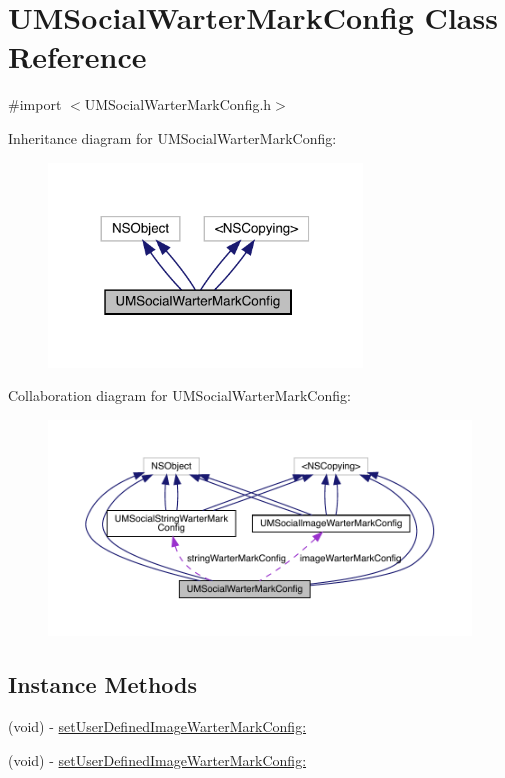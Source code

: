 \hypertarget{interface_u_m_social_warter_mark_config}{}\section{U\+M\+Social\+Warter\+Mark\+Config Class Reference}
\label{interface_u_m_social_warter_mark_config}


{\ttfamily \#import $<$U\+M\+Social\+Warter\+Mark\+Config.\+h$>$}



Inheritance diagram for U\+M\+Social\+Warter\+Mark\+Config\+:\nopagebreak
\begin{figure}[H]
\begin{center}
\leavevmode
\includegraphics[width=236pt]{interface_u_m_social_warter_mark_config__inherit__graph}
\end{center}
\end{figure}


Collaboration diagram for U\+M\+Social\+Warter\+Mark\+Config\+:\nopagebreak
\begin{figure}[H]
\begin{center}
\leavevmode
\includegraphics[width=350pt]{interface_u_m_social_warter_mark_config__coll__graph}
\end{center}
\end{figure}
\subsection*{Instance Methods}
\begin{DoxyCompactItemize}
\item 
(void) -\/ \mbox{\hyperlink{interface_u_m_social_warter_mark_config_aec167182f3c7c206a546aca523f305e0}{set\+User\+Defined\+Image\+Warter\+Mark\+Config\+:}}
\item 
(void) -\/ \mbox{\hyperlink{interface_u_m_social_warter_mark_config_aec167182f3c7c206a546aca523f305e0}{set\+User\+Defined\+Image\+Warter\+Mark\+Config\+:}}
\end{DoxyCompactItemize}
